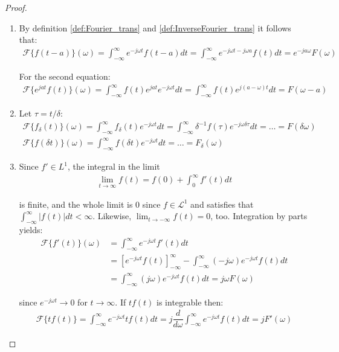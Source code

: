 \begin{proof}
\begin{enumerate}[label=(\alph*)]
\item
By definition \ref{def:Fourier_trans} and \ref{def:InverseFourier_trans} it follows that:
\begin{align*}
\mathcal{F}\{f(t-a)\}(\omega) = \int_{-\infty}^\infty e^{-j\omega t} f(t - a) dt = \int_{-\infty}^\infty e^{-j\omega t - j\omega a} f(t) dt = e^{-ja \omega} F(\omega)
\end{align*}

For the second equation:
\begin{align*}
\mathcal{F}\{e^{jat} f(t)\}(\omega) = \int_{-\infty}^\infty f(t) e^{jat} e^{-j \omega t} dt = \int_{-\infty}^\infty f(t) e^{j(a- \omega)t} dt = F(\omega - a)
\end{align*}

\item Let $\tau = t/\delta$: 
\begin{align*}
\mathcal{F}\{f_\delta(t)\}(\omega) = \int_{-\infty}^\infty f_\delta(t) e^{-j \omega t} dt = \int_{-\infty}^\infty \delta^{-1}f(\tau) e^{-j \omega \delta\tau} dt = \dots = F(\delta\omega) \\
\mathcal{F}\{f(\delta t)\}(\omega) = \int_{-\infty}^\infty f(\delta t) e^{-j \omega t} dt = \dots = F_\delta(\omega)
\end{align*}

\item Since $f' \in L^1$, the integral in the limit
\begin{align*}
\lim_{t \to \infty} f(t) = f(0) + \int_0^\infty f'(t) dt
\end{align*}

is finite, and the whole limit is 0 since $f\in \mathcal{L}^1$ and satisfies that $\int_{-\infty}^\infty |f(t)| dt < \infty$. Likewise, $\displaystyle{\lim_{t \to -\infty} f(t) = 0}$, too. Integration by parts yields:
\begin{align*}
\mathcal{F}\{f'(t)\}(\omega) &= \int_{-\infty}^\infty e^{-j \omega t} f'(t) dt \\
&= \left[ e^{-j\omega t} f(t) \right]_{-\infty}^\infty - \int_{-\infty}^\infty (-j \omega) e^{-j \omega t} f(t) dt \\
&= \int_{-\infty}^\infty (j \omega) e^{-j \omega t} f(t) dt = j\omega F(\omega)
\end{align*}

since $e^{-j\omega t} \to 0$ for $t \to \infty$. If $tf(t)$ is integrable then:
\begin{align*}
\mathcal{F}\{tf(t)\} = \int_{-\infty}^\infty e^{-j \omega t} t f(t) dt = j \dfrac{d}{d\omega} \int_{-\infty}^\infty e^{-j \omega t} f(t) dt = j F'(\omega)
\end{align*}


\end{enumerate}
\end{proof}
